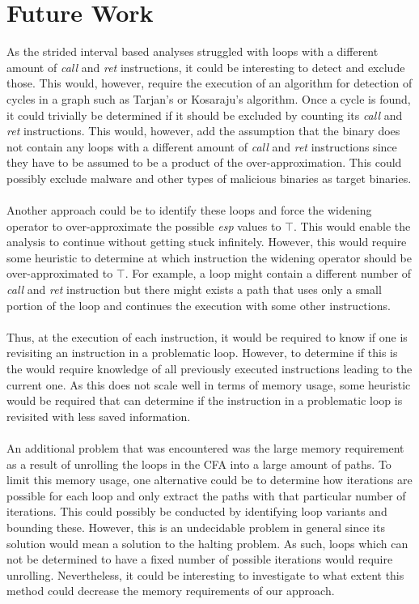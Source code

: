 \documentclass{kththesis}
\newcommand{\fbcomment}[1]{{#1}}
\renewcommand{\fbcomment}[1]{}
\renewcommand{\it}[1]{\textit{#1}}
\begin{document}
\section{Future Work}
\fbcomment{\color{red}Goal: Describe how the work in this thesis can be extended.}
As the strided interval based analyses struggled with loops with a different amount of \it{call} and \it{ret} instructions, it could be interesting to detect and exclude those. This would, however, require the execution of an algorithm for detection of cycles in a graph such as Tarjan's or Kosaraju's algorithm. Once a cycle is found, it could trivially be determined if it should be excluded by counting its \it{call} and \it{ret} instructions. This would, however, add the assumption that the binary does not contain any loops with a different amount of \it{call} and \it{ret} instructions since they have to be assumed to be a product of the over-approximation. This could possibly exclude malware and other types of malicious binaries as target binaries.
\\ \\
Another approach could be to identify these loops and force the widening operator to over-approximate the possible \it{esp} values to $\top$. This would enable the analysis to continue without getting stuck infinitely. However, this would require some heuristic to determine at which instruction the widening operator should be over-approximated to $\top$. For example, a loop might contain a different number of \it{call} and \it{ret} instruction but there might exists a path that uses only a small portion of the loop and continues the execution with some other instructions. 
\\ \\
Thus, at the execution of each instruction, it would be required to know if one is revisiting an instruction in a problematic loop. However, to determine if this is the would require knowledge of all previously executed instructions leading to the current one. As this does not scale well in terms of memory usage, some heuristic would be required that can determine if the instruction in a problematic loop is revisited with less saved information.
\\ \\
An additional problem that was encountered was the large memory requirement as a result of unrolling the loops in the CFA into a large amount of paths. To limit this memory usage, one alternative could be to determine how iterations are possible for each loop and only extract the paths with that particular number of iterations. This could possibly be conducted by identifying loop variants and bounding these. However, this is an undecidable problem in general since its solution would mean a solution to the halting problem. As such, loops which can not be determined to have a fixed number of possible iterations would require unrolling. Nevertheless, it could be interesting to investigate to what extent this method could decrease the memory requirements of our approach.
\end{document}

